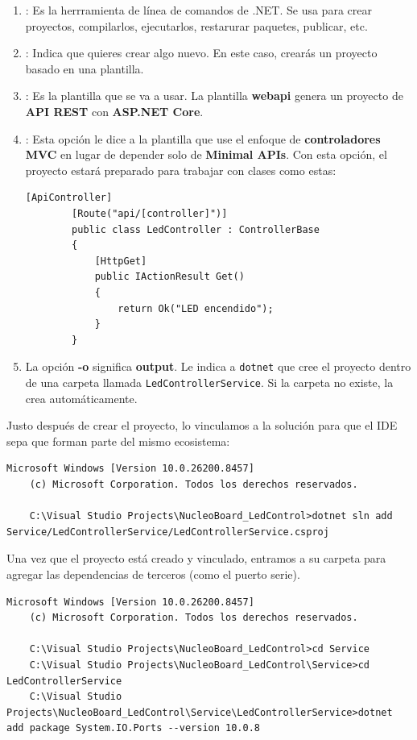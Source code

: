 \documentclass[
10pt, %
a4paper, %
oneside, %
headinclude,footinclude, %
BCOR5mm, %
]{scrartcl}
\begin{document}
\begin{enumerate}
	\item {}: Es la herrramienta de línea de comandos de .NET. Se usa para crear proyectos, compilarlos, ejecutarlos, restarurar paquetes, publicar, etc.
	\item {}: Indica que quieres crear algo nuevo. En este caso, crearás un proyecto basado en una plantilla.
	\item {}: Es la plantilla que se va a usar. La plantilla \textbf{webapi} genera un proyecto de \textbf{API REST} con \textbf{ASP.NET Core}.
	\item {}: Esta opción le dice a la plantilla que use el enfoque de \textbf{controladores MVC} en lugar de depender solo de \textbf{Minimal APIs}. Con esta opción, el proyecto estará preparado para trabajar con clases como estas:
	\begin{lstlisting}[style=VSCodeDark]
		[ApiController]
		[Route("api/[controller]")]
		public class LedController : ControllerBase
		{
			[HttpGet]
			public IActionResult Get()
			{
				return Ok("LED encendido");
			}
		}\end{lstlisting}
	\item {} La opción \textbf{-o} significa \textbf{output}. Le indica a \texttt{dotnet} que cree el proyecto dentro de una carpeta llamada \texttt{LedControllerService}. Si la carpeta no existe, la crea automáticamente.
\end{enumerate}



Justo después de crear el proyecto, lo vinculamos a la solución para que el IDE sepa que forman parte del mismo ecosistema:
\begin{lstlisting}[language=DOS]
	Microsoft Windows [Version 10.0.26200.8457]
	(c) Microsoft Corporation. Todos los derechos reservados.
	
	C:\Visual Studio Projects\NucleoBoard_LedControl>dotnet sln add Service/LedControllerService/LedControllerService.csproj
\end{lstlisting}

Una vez que el proyecto está creado y vinculado, entramos a su carpeta para agregar las dependencias de terceros (como el puerto serie).
\begin{lstlisting}[language=DOS]
	Microsoft Windows [Version 10.0.26200.8457]
	(c) Microsoft Corporation. Todos los derechos reservados.
	
	C:\Visual Studio Projects\NucleoBoard_LedControl>cd Service
	C:\Visual Studio Projects\NucleoBoard_LedControl\Service>cd LedControllerService 
	C:\Visual Studio Projects\NucleoBoard_LedControl\Service\LedControllerService>dotnet add package System.IO.Ports --version 10.0.8
\end{lstlisting}
\end{document}
